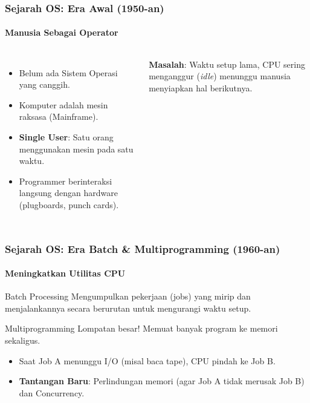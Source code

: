 \documentclass[t,aspectratio=169,xcolor=dvipsnames]{beamer}
\begin{document}
\begin{frame}[t]
    \frametitle{Sejarah OS: Era Awal (1950-an)}
    \framesubtitle{Manusia Sebagai Operator}
    
    \begin{columns}
        \begin{itemize}
            \item Belum ada Sistem Operasi yang canggih.
            \item Komputer adalah mesin raksasa (Mainframe).
            \item \textbf{Single User}: Satu orang menggunakan mesin pada satu waktu.
            \item Programmer berinteraksi langsung dengan hardware (plugboards, punch cards).
        \end{itemize}
        
        \vspace{0.2cm}
        \textbf{Masalah}: Waktu setup lama, CPU sering menganggur (\textit{idle}) menunggu manusia menyiapkan hal berikutnya.
    \end{columns}
\end{frame}

\begin{frame}[t]
    \frametitle{Sejarah OS: Era Batch \& Multiprogramming (1960-an)}
    \framesubtitle{Meningkatkan Utilitas CPU}
    
    \begin{block}{Batch Processing}
        Mengumpulkan pekerjaan (jobs) yang mirip dan menjalankannya secara berurutan untuk mengurangi waktu setup.
    \end{block}
    
    \begin{alertblock}{Multiprogramming}
        Lompatan besar! Memuat banyak program ke memori sekaligus.
        \begin{itemize}
            \item Saat Job A menunggu I/O (misal baca tape), CPU pindah ke Job B.
            \item \textbf{Tantangan Baru}: Perlindungan memori (agar Job A tidak merusak Job B) dan Concurrency.
        \end{itemize}
    \end{alertblock}
\end{frame}
\end{document}
